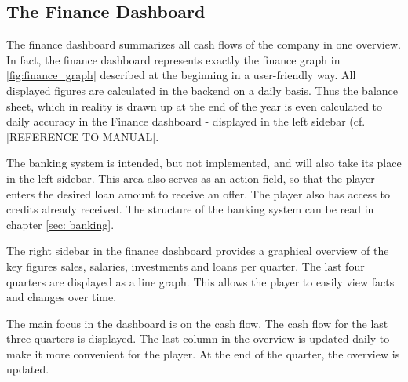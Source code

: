 \subsection{The Finance Dashboard}
\label{sec:finance_dashboard}

The finance dashboard summarizes all cash flows of the company in one overview. In fact, the finance dashboard represents exactly the finance graph in \ref{fig:finance_graph} described at the beginning in a user-friendly way. All displayed figures are calculated in the backend on a daily basis. Thus the balance sheet, which in reality is drawn up at the end of the year is even calculated to daily accuracy in the Finance dashboard - displayed in the left sidebar (cf. [REFERENCE TO MANUAL].

The banking system is intended, but not implemented, and will also take its place in the left sidebar. This area also serves as an action field, so that the player enters the desired loan amount to receive an offer. The player also has access to credits already received. The structure of the banking system can be read in chapter \ref{sec: banking}. 

The right sidebar in the finance dashboard provides a graphical overview of the key figures sales, salaries, investments and loans per quarter. The last four quarters are displayed as a line graph. This allows the player to easily view facts and changes over time. 

The main focus in the dashboard is on the cash flow. The cash flow for the last three quarters is displayed. The last column in the overview is updated daily to make it more convenient for the player. At the end of the quarter, the overview is updated. 
